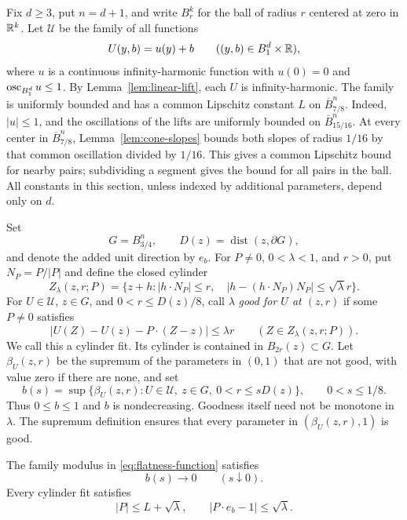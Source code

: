 Fix $d\ge3$, put $n=d+1$, and write $B_r^k$ for the ball of radius $r$ centered at zero in $\mathbb{R}^k$. Let $\mathcal U$ be the family of all functions
\[
  U(y,b)=u(y)+b\qquad ((y,b)\in B_1^d\times\mathbb{R}),
\]
where $u$ is a continuous infinity-harmonic function with
$u(0)=0$ and $\operatorname{osc}_{B_1^d}u\le1$. By Lemma~\ref{lem:linear-lift}, each $U$ is infinity-harmonic. The family is uniformly bounded and has a common Lipschitz constant $L$ on $\overline B_{7/8}^n$. Indeed, $|u|\le1$, and the oscillations of the lifts are uniformly bounded on $\overline B_{15/16}^n$. At every center in $\overline B_{7/8}^n$, Lemma~\ref{lem:cone-slopes} bounds both slopes of radius $1/16$ by that common oscillation divided by $1/16$. This gives a common Lipschitz bound for nearby pairs; subdividing a segment gives the bound for all pairs in the ball. All constants in this section, unless indexed by additional parameters, depend only on $d$.

Set
\[
  G=B_{3/4}^n,\qquad D(z)=\operatorname{dist}(z,\partial G),
\]
and denote the added unit direction by $e_b$. For $P\ne0$, $0<\lambda<1$, and $r>0$, put $N_P=P/|P|$ and define the closed cylinder
\[
  Z_\lambda(z,r;P)
   =\{z+h: |h\cdot N_P|\le r,\quad
               |h-(h\cdot N_P)N_P|\le\sqrt\lambda r\}.
\]
For $U\in\mathcal U$, $z\in G$, and $0<r\le D(z)/8$, call $\lambda$ \emph{good for $U$ at $(z,r)$} if some $P\ne0$ satisfies
\begin{equation}\label{eq:physical-fit}
  |U(Z)-U(z)-P\cdot(Z-z)|\le\lambda r
       \qquad (Z\in Z_\lambda(z,r;P)).
\end{equation}
We call this a cylinder fit. Its cylinder is contained in $B_{2r}(z)\subset G$. Let $\beta_U(z,r)$ be the supremum of the parameters in $(0,1)$ that are not good, with value zero if there are none, and set
\begin{equation}\label{eq:flatness-function}
  b(s)=\sup\{\beta_U(z,r):U\in\mathcal U,\ z\in G,
                        \ 0<r\le sD(z)\},\qquad 0<s\le1/8.
\end{equation}
Thus $0\le b\le1$ and $b$ is nondecreasing. Goodness itself need not be monotone in $\lambda$. The supremum definition ensures that every parameter in $(\beta_U(z,r),1)$ is good.

\begin{lemma}\label{lem:family-flatness}
The family modulus in \eqref{eq:flatness-function} satisfies
\begin{equation}\label{eq:family-flatness}
  b(s)\longrightarrow0\qquad(s\downarrow0).
\end{equation}
Every cylinder fit satisfies
\begin{equation}\label{eq:physical-slope-bounds}
  |P|\le L+\sqrt\lambda,\qquad
  |P\cdot e_b-1|\le\sqrt\lambda.
\end{equation}
\end{lemma}

